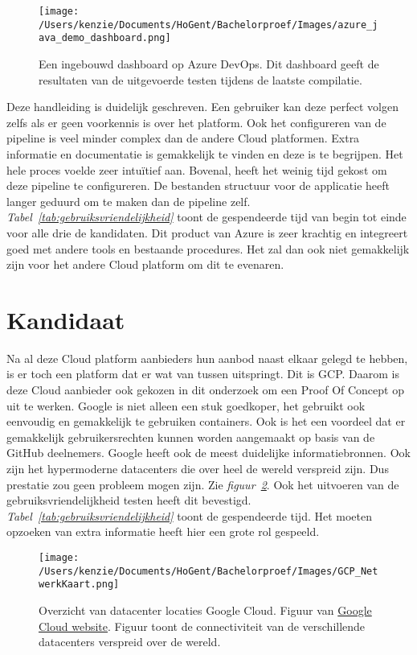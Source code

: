 \begin{figure}[!htbp]
    \centering
    \texttt{[image: /Users/kenzie/Documents/HoGent/Bachelorproef/Images/azure\_java\_demo\_dashboard.png]}
    \caption{Een ingebouwd dashboard op Azure DevOps. Dit dashboard geeft de resultaten van de uitgevoerde testen tijdens de laatste compilatie.}
    \label{fig:azure_java_demo_dashboard}
\end{figure}

Deze handleiding is duidelijk geschreven. Een gebruiker kan deze perfect volgen zelfs als er geen voorkennis is over het platform. Ook het configureren van de pipeline is veel minder complex dan de andere Cloud platformen. Extra informatie en documentatie is gemakkelijk te vinden en deze is te begrijpen. Het hele proces voelde zeer intuïtief aan. Bovenal, heeft het weinig tijd gekost om deze pipeline te configureren. De bestanden structuur voor de applicatie heeft langer geduurd om te maken dan de pipeline zelf. \emph{Tabel~\ref{tab:gebruiksvriendelijkheid}} toont de gespendeerde tijd van begin tot einde voor alle drie de kandidaten. Dit product van Azure is zeer krachtig en integreert goed met andere tools en bestaande procedures. Het zal dan ook niet gemakkelijk zijn voor het andere Cloud platform om dit te evenaren.

\section{Kandidaat}
\label{sec:kandidaat}
Na al deze Cloud platform aanbieders hun aanbod naast elkaar gelegd te hebben, is er toch een platform dat er wat van tussen uitspringt. Dit is GCP. Daarom is deze Cloud aanbieder ook gekozen in dit onderzoek om een Proof Of Concept op uit te werken. Google is niet alleen een stuk goedkoper, het gebruikt ook eenvoudig en gemakkelijk te gebruiken containers. Ook is het een voordeel dat er gemakkelijk gebruikersrechten kunnen worden aangemaakt op basis van de GitHub deelnemers. Google heeft ook de meest duidelijke informatiebronnen. Ook zijn het hypermoderne datacenters die over heel de wereld verspreid zijn. Dus prestatie zou geen probleem mogen zijn. Zie \emph{figuur~\ref{fig:GCP_NetwerkKaart}}. Ook het uitvoeren van de gebruiksvriendelijkheid testen heeft dit bevestigd. \emph{Tabel~\ref{tab:gebruiksvriendelijkheid}} toont de gespendeerde tijd. Het moeten opzoeken van extra informatie heeft hier een grote rol gespeeld.

\begin{figure}[!htbp]
    \centering
    \texttt{[image: /Users/kenzie/Documents/HoGent/Bachelorproef/Images/GCP\_NetwerkKaart.png]}
    \caption{Overzicht van datacenter locaties Google Cloud. Figuur van \href{}{Google Cloud website}. Figuur toont de connectiviteit van de verschillende datacenters verspreid over de wereld.}
    \label{fig:GCP_NetwerkKaart}
\end{figure}

